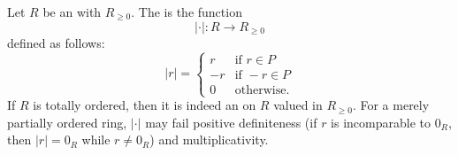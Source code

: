 \begin{definition} \label{definition:standard_absolute_value_of_an_ordered_ring}
    Let $R$ be an  with  $R_{\geq 0}$.
    The  is the function
    $$|\cdot|: R \to R_{\geq 0}$$
    defined as follows:
    $$|r| = \begin{cases} r &\text{if } r \in P \\ -r &\text{if } -r \in P \\ 0 &\text{otherwise}.\end{cases}$$
    If $R$ is totally ordered, then it is indeed an  on $R$ valued in $R_{\geq 0}$.  For a merely partially ordered ring, $|\cdot|$ may fail positive definiteness (if $r$ is incomparable to $0_R$, then $|r| = 0_R$ while $r \neq 0_R$) and multiplicativity.
\end{definition}